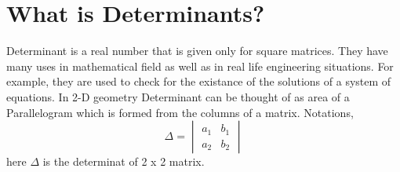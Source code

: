 \documentclass{article}
\begin{document}
\section{What is Determinants?}
Determinant is a real number that is given only for square matrices. They have many uses in mathematical field as well as in real life engineering situations. For example, they are used to check for the existance of the solutions of a system of equations. In 2-D geometry Determinant can be thought of as area of a Parallelogram which is formed from the columns of a matrix. Notations,
\begin{equation*}
    \Delta=
    \begin{vmatrix}
        a_1 & b_1 \\
        a_2 & b_2 
    \end{vmatrix}
\end{equation*}
here $\Delta$ is the determinat of 2 x 2 matrix.
\end{document}
